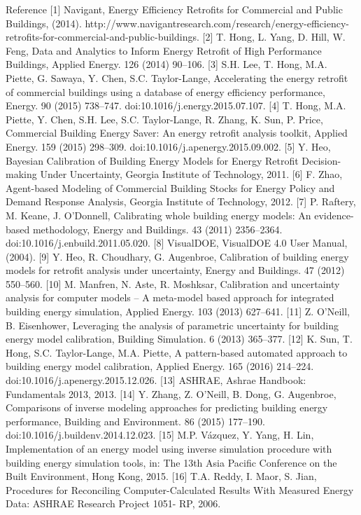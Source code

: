 Reference
[1]	Navigant, Energy Efficiency Retrofits for Commercial and Public Buildings, (2014). http://www.navigantresearch.com/research/energy-efficiency-retrofits-for-commercial-and-public-buildings.
[2]	T. Hong, L. Yang, D. Hill, W. Feng, Data and Analytics to Inform Energy Retrofit of High Performance Buildings, Applied Energy. 126 (2014) 90–106.
[3]	S.H. Lee, T. Hong, M.A. Piette, G. Sawaya, Y. Chen, S.C. Taylor-Lange, Accelerating the energy retrofit of commercial buildings using a database of energy efficiency performance, Energy. 90 (2015) 738–747. doi:10.1016/j.energy.2015.07.107.
[4]	T. Hong, M.A. Piette, Y. Chen, S.H. Lee, S.C. Taylor-Lange, R. Zhang, K. Sun, P. Price, Commercial Building Energy Saver: An energy retrofit analysis toolkit, Applied Energy. 159 (2015) 298–309. doi:10.1016/j.apenergy.2015.09.002.
[5]	Y. Heo, Bayesian Calibration of Building Energy Models for Energy Retrofit Decision-making Under Uncertainty, Georgia Institute of Technology, 2011.
[6]	F. Zhao, Agent-based Modeling of Commercial Building Stocks for Energy Policy and Demand Response Analysis, Georgia Institute of Technology, 2012.
[7]	P. Raftery, M. Keane, J. O’Donnell, Calibrating whole building energy models: An evidence-based methodology, Energy and Buildings. 43 (2011) 2356–2364. doi:10.1016/j.enbuild.2011.05.020.
[8]	VisualDOE, VisualDOE 4.0 User Manual, (2004).
[9]	Y. Heo, R. Choudhary, G. Augenbroe, Calibration of building energy models for retrofit analysis under uncertainty, Energy and Buildings. 47 (2012) 550–560.
[10]	M. Manfren, N. Aste, R. Moshksar, Calibration and uncertainty analysis for computer models – A meta-model based approach for integrated building energy simulation, Applied Energy. 103 (2013) 627–641.
[11]	Z. O’Neill, B. Eisenhower, Leveraging the analysis of parametric uncertainty for building energy model calibration, Building Simulation. 6 (2013) 365–377.
[12]	K. Sun, T. Hong, S.C. Taylor-Lange, M.A. Piette, A pattern-based automated approach to building energy model calibration, Applied Energy. 165 (2016) 214–224. doi:10.1016/j.apenergy.2015.12.026.
[13]	ASHRAE, Ashrae Handbook: Fundamentals 2013, 2013.
[14]	Y. Zhang, Z. O’Neill, B. Dong, G. Augenbroe, Comparisons of inverse modeling approaches for predicting building energy performance, Building and Environment. 86 (2015) 177–190. doi:10.1016/j.buildenv.2014.12.023.
[15]	M.P. Vázquez, Y. Yang, H. Lin, Implementation of an energy model using inverse simulation procedure with building energy simulation tools, in: The 13th Asia Pacific Conference on the Built Environment, Hong Kong, 2015.
[16]	T.A. Reddy, I. Maor, S. Jian, Procedures for Reconciling Computer-Calculated Results With Measured Energy Data: ASHRAE Research Project 1051- RP, 2006.
